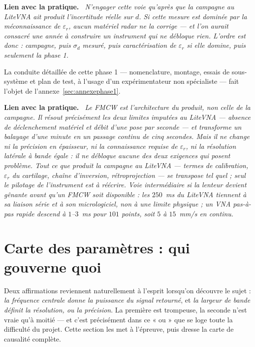 \documentclass[11pt,a4paper]{article}
\newenvironment{implication}%
  {\par\medskip\begin{lrbox}{\implbox}\begin{minipage}{0.95\textwidth}%
   \textbf{Lien avec la pratique.}\itshape\ }%
  {\end{minipage}\end{lrbox}\noindent\fbox{\usebox{\implbox}}\par\medskip}
\newcommand{\eps}{\varepsilon_r}
\begin{document}
\begin{implication}
N'engager cette voie qu'\emph{après} que la campagne au LiteVNA ait produit
l'incertitude réelle sur $d$. Si cette mesure est dominée par la méconnaissance
de $\eps$, aucun matériel radar ne la corrige --- et l'on aurait consacré une
année à construire un instrument qui ne débloque rien. L'ordre est donc :
campagne, puis $\sigma_d$ mesuré, puis caractérisation de $\eps$ si elle domine,
puis seulement la phase 1.
\end{implication}

\noindent
La conduite détaillée de cette phase 1 --- nomenclature, montage, essais de
sous-système et plan de test, à l'usage d'un expérimentateur non spécialiste ---
fait l'objet de l'annexe~\ref{sec:annexephase1}.

\begin{implication}
Le FMCW est l'architecture du \emph{produit}, non celle de la campagne. Il
résout précisément les deux limites imputées au LiteVNA --- absence de
déclenchement matériel et débit d'une pose par seconde --- et transforme un
balayage d'une minute en un passage continu de cinq secondes. Mais il ne change
ni la précision en épaisseur, ni la connaissance requise de $\eps$, ni la
résolution latérale à bande égale : il ne débloque aucune des deux exigences qui
posent problème. Tout ce que produit la campagne au LiteVNA --- termes de
calibration, $\eps$ du cartilage, chaîne d'inversion, rétroprojection --- se
transpose tel quel ; seul le pilotage de l'instrument est à réécrire. Voie
intermédiaire si la lenteur devient gênante avant qu'un FMCW soit disponible :
les $250$~ms du LiteVNA tiennent à sa liaison série et à son micrologiciel, non
à une limite physique ; un VNA pas-à-pas rapide descend à $1$--$3$~ms pour $101$
points, soit $5$ à $15$~mm/s en continu.
\end{implication}

\section{Carte des paramètres : qui gouverne quoi}
\label{sec:carte}

Deux affirmations reviennent naturellement à l'esprit lorsqu'on découvre le
sujet : \emph{la fréquence centrale donne la puissance du signal retourné}, et
\emph{la largeur de bande définit la résolution, ou la précision}. La première
est trompeuse, la seconde n'est vraie qu'à moitié --- et c'est précisément dans
ce « ou » que se loge toute la difficulté du projet. Cette section les met à
l'épreuve, puis dresse la carte de causalité complète.
\end{document}
